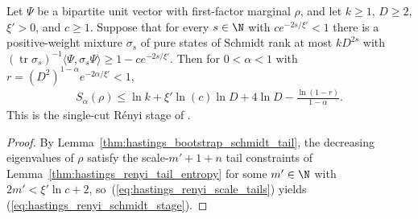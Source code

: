 \begin{lemma}
    \label{thm:hastings_renyi_schmidt_rank_stage}
    \leanok
    Let $\Psi$ be a bipartite unit vector with first-factor marginal $\rho$,
    and let $k\ge1$, $D\ge2$, $\xi'>0$, and $c\ge1$. Suppose that for every
    $s\in\N$ with $ce^{-2s/\xi'}<1$ there is a positive-weight mixture $\sigma_s$
    of pure states of Schmidt rank at most $kD^{2s}$ with
    $(\operatorname{tr}\sigma_s)^{-1}\langle\Psi,\sigma_s\Psi\rangle\ge1-ce^{-2s/\xi'}$.
    Then for $0<\alpha<1$ with $r=(D^2)^{1-\alpha}e^{-2\alpha/\xi'}<1$,
    \begin{align}
        S_\alpha(\rho)\le\ln k+\xi'\ln(c)\ln D+4\ln D-\frac{\ln(1-r)}{1-\alpha}.
        \label{eq:hastings_renyi_schmidt_stage}
    \end{align}
    This is the single-cut Rényi stage of \cite[Lemma~2, lines 333--356 and
        392--410]{Hastings2007AreaLaw}.
\end{lemma}
\begin{proof}\leanok
    By Lemma~\ref{thm:hastings_bootstrap_schmidt_tail}, the decreasing
    eigenvalues of $\rho$ satisfy the scale-$m'+1+n$ tail constraints of
    Lemma~\ref{thm:hastings_renyi_tail_entropy} for some $m'\in\N$ with
    $2m'<\xi'\ln c+2$, so~(\ref{eq:hastings_renyi_scale_tails}) yields
    (\ref{eq:hastings_renyi_schmidt_stage}).
\end{proof}

